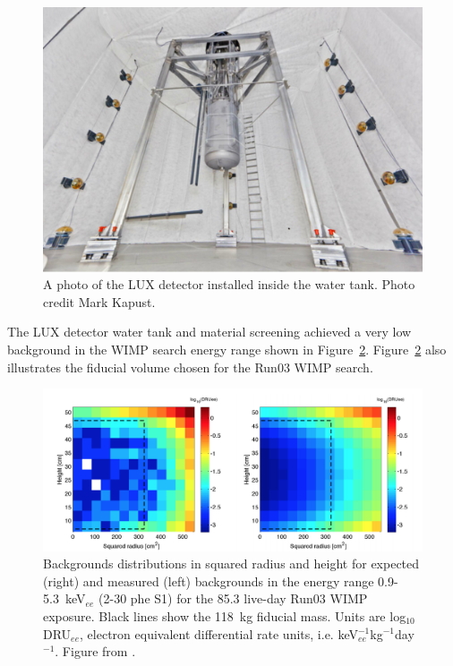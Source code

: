 \begin{figure}[htbp]
\begin{center}
\includegraphics[width=\textwidth]{figures/lux/lux_watertank.png}
\caption{A photo of the \acs{LUX} detector installed inside the water tank. Photo credit Mark Kapust.}
\label{fig:luxwatertank}
\end{center}
\end{figure}

The \ac{LUX} detector water tank and material screening achieved a very low background in the \ac{WIMP} search energy range shown in Figure~\ref{fig:luxrun03bkg}. Figure~\ref{fig:luxrun03bkg} also illustrates the fiducial volume chosen for the Run03 \ac{WIMP} search.

\begin{figure}[htbp]
\begin{center}
\includegraphics[width=\textwidth]{figures/lux/lux_run03bkg.png}
\caption{Backgrounds distributions in squared radius and height for expected (right) and measured (left) backgrounds in the energy range 0.9-5.3~keV$_{ee}$ (2-30 phe S1) for the 85.3 live-day Run03 \acs{WIMP} exposure. Black lines show the 118~kg fiducial mass. Units are log$_{10}$DRU$_{ee}$, electron equivalent differential rate units, i.e. keV$_{ee}^{-1}$kg$^{-1}$day$^{-1}$.  Figure from \cite{LUXRun03Backgrounds}. }
\label{fig:luxrun03bkg}
\end{center}
\end{figure}


